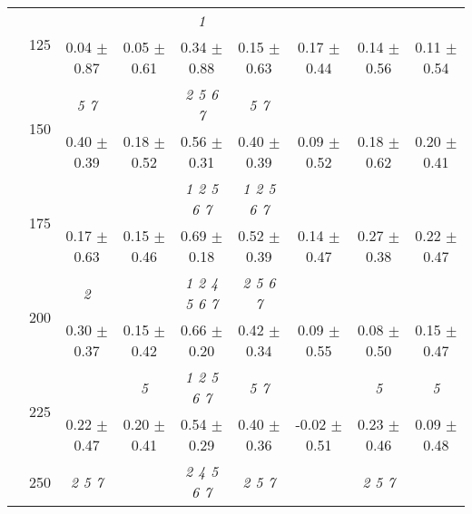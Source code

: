 \begin{table}[h]
{\begin{tabular}{
        ccccccccc}
 & \multirow{2}{*}{125}& \cellcolor[HTML]{EFEFEF} & \cellcolor[HTML]{EFEFEF} & \cellcolor[HTML]{EFEFEF} \textit{ 1 }& \cellcolor[HTML]{EFEFEF} & \cellcolor[HTML]{EFEFEF} & \cellcolor[HTML]{EFEFEF} & \cellcolor[HTML]{EFEFEF}  \\ 
 & & \cellcolor[HTML]{EFEFEF} 0.04 $\pm$ 0.87& \cellcolor[HTML]{EFEFEF} 0.05 $\pm$ 0.61& \cellcolor[HTML]{EFEFEF} 0.34 $\pm$ 0.88& \cellcolor[HTML]{EFEFEF} 0.15 $\pm$ 0.63& \cellcolor[HTML]{EFEFEF} 0.17 $\pm$ 0.44& \cellcolor[HTML]{EFEFEF} 0.14 $\pm$ 0.56& \cellcolor[HTML]{EFEFEF} 0.11 $\pm$ 0.54 \\ 
 & \multirow{2}{*}{150}& \textit{ 5 7 }& & \textit{ 2 5 6 7 }& \textit{ 5 7 }& & &  \\ 
 & & 0.40 $\pm$ 0.39& 0.18 $\pm$ 0.52& 0.56 $\pm$ 0.31& 0.40 $\pm$ 0.39& 0.09 $\pm$ 0.52& 0.18 $\pm$ 0.62& 0.20 $\pm$ 0.41 \\ 
 & \multirow{2}{*}{175}& \cellcolor[HTML]{EFEFEF} & \cellcolor[HTML]{EFEFEF} & \cellcolor[HTML]{EFEFEF} \textit{ 1 2 5 6 7 }& \cellcolor[HTML]{EFEFEF} \textit{ 1 2 5 6 7 }& \cellcolor[HTML]{EFEFEF} & \cellcolor[HTML]{EFEFEF} & \cellcolor[HTML]{EFEFEF}  \\ 
 & & \cellcolor[HTML]{EFEFEF} 0.17 $\pm$ 0.63& \cellcolor[HTML]{EFEFEF} 0.15 $\pm$ 0.46& \cellcolor[HTML]{EFEFEF} 0.69 $\pm$ 0.18& \cellcolor[HTML]{EFEFEF} 0.52 $\pm$ 0.39& \cellcolor[HTML]{EFEFEF} 0.14 $\pm$ 0.47& \cellcolor[HTML]{EFEFEF} 0.27 $\pm$ 0.38& \cellcolor[HTML]{EFEFEF} 0.22 $\pm$ 0.47 \\ 
 & \multirow{2}{*}{200}& \textit{ 2 }& & \textit{ 1 2 4 5 6 7 }& \textit{ 2 5 6 7 }& & &  \\ 
 & & 0.30 $\pm$ 0.37& 0.15 $\pm$ 0.42& 0.66 $\pm$ 0.20& 0.42 $\pm$ 0.34& 0.09 $\pm$ 0.55& 0.08 $\pm$ 0.50& 0.15 $\pm$ 0.47 \\ 
 & \multirow{2}{*}{225}& \cellcolor[HTML]{EFEFEF} & \cellcolor[HTML]{EFEFEF} \textit{ 5 }& \cellcolor[HTML]{EFEFEF} \textit{ 1 2 5 6 7 }& \cellcolor[HTML]{EFEFEF} \textit{ 5 7 }& \cellcolor[HTML]{EFEFEF} & \cellcolor[HTML]{EFEFEF} \textit{ 5 }& \cellcolor[HTML]{EFEFEF} \textit{ 5 } \\ 
 & & \cellcolor[HTML]{EFEFEF} 0.22 $\pm$ 0.47& \cellcolor[HTML]{EFEFEF} 0.20 $\pm$ 0.41& \cellcolor[HTML]{EFEFEF} 0.54 $\pm$ 0.29& \cellcolor[HTML]{EFEFEF} 0.40 $\pm$ 0.36& \cellcolor[HTML]{EFEFEF} -0.02 $\pm$ 0.51& \cellcolor[HTML]{EFEFEF} 0.23 $\pm$ 0.46& \cellcolor[HTML]{EFEFEF} 0.09 $\pm$ 0.48 \\ 
 & \multirow{2}{*}{250}& \textit{ 2 5 7 }& & \textit{ 2 4 5 6 7 }& \textit{ 2 5 7 }& & \textit{ 2 5 7 }&  \\ 

\end{tabular}}
\end{table}
